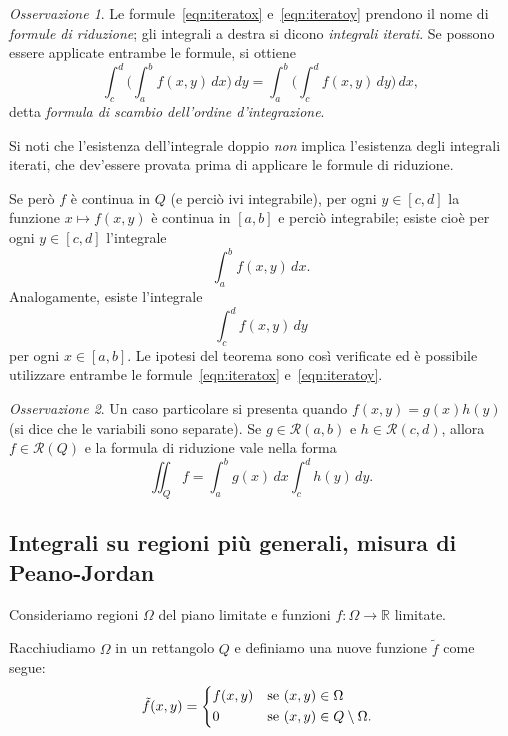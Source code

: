 \documentclass[a4paper]{book}
\numberwithin{equation}{section}
\theoremstyle{plain}
\theoremstyle{definition}
\theoremstyle{remark}
\newtheorem{oss}{Osservazione}[section]
\theoremstyle{example}
\begin{document}
		\begin{oss}
			Le formule~\eqref{eqn:iteratox} e~\eqref{eqn:iteratoy} prendono il nome di \emph{formule di riduzione}; gli integrali a destra si dicono \emph{integrali iterati}. Se possono essere applicate entrambe le formule, si ottiene
			\begin{equation}
				\int_c^d \biggl( \int_a^b f(x,y) \, dx \biggr) \, dy = \int_a^b \biggl( \int_c^d f(x,y) \,dy \biggr) \, dx,
			\end{equation}
			detta \emph{formula di scambio dell'ordine d'integrazione}.
		\end{oss}

		Si noti che l'esistenza dell'integrale doppio \emph{non} implica l'esistenza degli integrali iterati, che dev'essere provata prima di applicare le formule di riduzione.

		Se però $f$ è continua in $Q$ (e perciò ivi integrabile), per ogni $y \in [c,d]$ la funzione $x \mapsto f(x, y)$ è continua in $[a, b]$ e perciò integrabile; esiste cioè per ogni $y \in [c, d]$ l'integrale
		\begin{equation*}
			\int_a^b f(x,y) \, dx.
		\end{equation*}
		Analogamente, esiste l'integrale
		\begin{equation*}
			\int_c^d f(x,y) \, dy
		\end{equation*}
		per ogni $x \in [a, b]$. Le ipotesi del teorema sono così verificate ed è possibile utilizzare entrambe le formule~\eqref{eqn:iteratox} e~\eqref{eqn:iteratoy}.

		\begin{oss}
			Un caso particolare si presenta quando $f(x,y) = g(x)h(y)$ (si dice che le variabili sono separate). Se $g \in \mathcal{R}(a,b)$ e $h \in \mathcal{R}(c, d)$, allora $f \in \mathcal{R}(Q)$ e la formula di riduzione vale nella forma
			\begin{equation}
				\iint_Q f = \int_a^b g(x) \, dx \int_c^d h(y)\,dy.
			\end{equation}
		\end{oss}

		\subsection{Integrali su regioni più generali, misura di Peano-Jordan}
		Consideriamo regioni $\Omega$ del piano limitate e funzioni $f \colon \Omega \to \mathbb{R}$ limitate.

		Racchiudiamo $\Omega$ in un rettangolo $Q$ e definiamo una nuove funzione $\tilde{f}$ come segue:
		\begin{equation}
			\tilde{f}(x, y) = \begin{dcases*}
			f(x,y) &se $(x, y) \in \Omega$ \\
			0 &se $(x, y) \in Q\setminus \Omega$.
		\end{dcases*}
	\end{equation}
\end{document}
